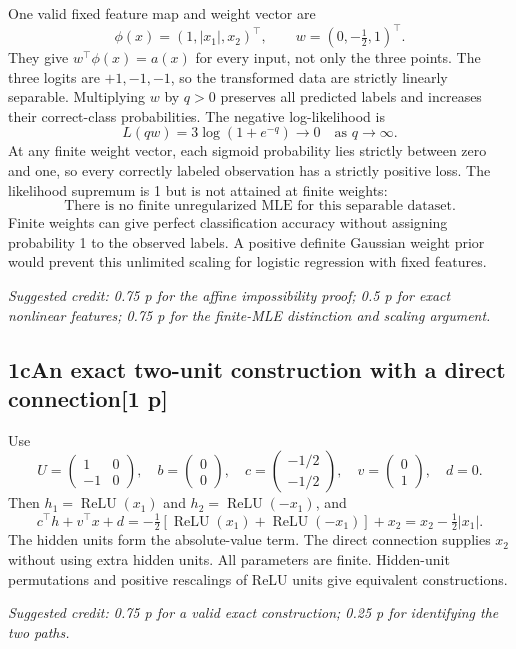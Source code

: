 \documentclass[11pt,a4paper]{article}
\DeclareMathOperator{\ReLU}{ReLU}
\newcommand{\solution}[3]{\Needspace{6\baselineskip}\subsection*{\color{examblue}#1\quad #2\hfill\normalsize[#3 p]}}
\newcommand{\selfcredit}[1]{\par\textit{Suggested credit: #1}\par}
\begin{document}
One valid fixed feature map and weight vector are
\[
\boxed{\phi(x)=(1,|x_1|,x_2)^\top,\qquad
w=(0,-\tfrac12,1)^\top}.
\]
They give $w^\top\phi(x)=a(x)$ for every input, not only the three points.
The three logits are $+1,-1,-1$, so the transformed data are strictly
linearly separable. Multiplying $w$ by $q>0$ preserves all predicted labels
and increases their correct-class probabilities. The negative log-likelihood is
\[
L(qw)=3\log(1+e^{-q})\longrightarrow0\quad\text{as }q\to\infty.
\]
At any finite weight vector, each sigmoid probability lies strictly between
zero and one, so every correctly labeled observation has a strictly positive
loss. The likelihood supremum is 1 but is not attained at finite weights:
\[
\boxed{\text{There is no finite unregularized MLE for this separable dataset.}}
\]
Finite weights can give perfect classification accuracy without assigning
probability 1 to the observed labels. A positive definite Gaussian weight prior
would prevent this unlimited scaling for logistic regression with fixed features.
\selfcredit{0.75 p for the affine impossibility proof; 0.5 p for exact nonlinear features; 0.75 p for the finite-MLE distinction and scaling argument.}

\solution{1c}{An exact two-unit construction with a direct connection}{1}
Use
\[
\boxed{U=\begin{pmatrix}1&0\\-1&0\end{pmatrix},\quad
b=\begin{pmatrix}0\\0\end{pmatrix},\quad
c=\begin{pmatrix}-1/2\\-1/2\end{pmatrix},\quad
v=\begin{pmatrix}0\\1\end{pmatrix},\quad d=0}.
\]
Then $h_1=\ReLU(x_1)$ and $h_2=\ReLU(-x_1)$, and
\[
c^\top h+v^\top x+d
=-\tfrac12[\ReLU(x_1)+\ReLU(-x_1)]+x_2
=x_2-\tfrac12|x_1|.
\]
The hidden units form the absolute-value term. The direct connection supplies
$x_2$ without using extra hidden units. All parameters are finite. Hidden-unit
permutations and positive rescalings of ReLU units give equivalent constructions.
\selfcredit{0.75 p for a valid exact construction; 0.25 p for identifying the two paths.}
\end{document}
